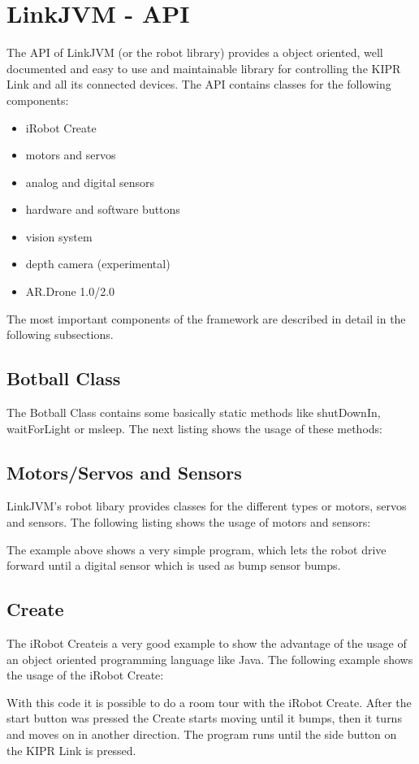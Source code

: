 \documentclass{juniorjournal}
\begin{document}
\section{LinkJVM - API}
The API of LinkJVM (or the robot library) provides a object oriented, well documented and easy to use and maintainable library for controlling the KIPR Link and all its connected devices.
The API contains classes for the following components:
\begin{itemize}
	\item iRobot Create\cite{create}
	\item motors and servos
	\item analog and digital sensors
	\item hardware and software buttons
	\item vision system
	\item depth camera (experimental)
	\item AR.Drone 1.0/2.0\cite{ar.drone}
\end{itemize}
The most important components of the framework are described in detail in the following subsections.

\subsection{Botball Class}
The Botball Class contains some basically static methods like shutDownIn,
waitForLight or msleep.
The next listing shows the usage of these methods:


\subsection{Motors/Servos and Sensors}
LinkJVM's robot libary provides classes for the different types or motors, servos and sensors.
The following listing shows the usage of motors and sensors:

The example above shows a very simple program, which lets the robot drive forward
until a digital sensor which is used as bump sensor bumps.

\subsection{Create}
The iRobot Createis a very good example to show the advantage of the usage of
an object oriented programming language like Java.
The following example shows the usage of the iRobot Create:

With this code it is possible to do a room tour with the iRobot Create.
After the start button was pressed the Create starts moving until it bumps, then
it turns and moves on in another direction. The program runs until the side
button on the KIPR Link is pressed.
\end{document}

